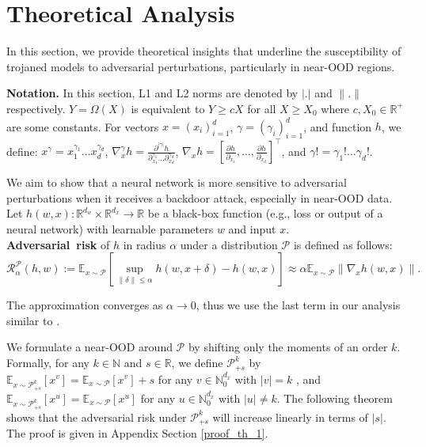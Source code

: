 \section{Theoretical Analysis }
\label{sec:theory}
{\small
In this section, we provide theoretical insights that underline the susceptibility of trojaned models to adversarial perturbations, particularly in near-OOD regions. 

\textbf{Notation.} In this section, L1 and L2 norms are denoted by $|.|$ and $\|.\|$ respectively. $Y = \Omega(X)$ is equivalent to $Y \geq cX$ for all $X \geq X_0$ where $c, X_0 \in \mathbb{R}^{+}$ are some constants. For vectors $x = (x_i)_{i=1}^{d}$, $\gamma = (\gamma_i)_{i=1}^{d}$, and function $h$, we define: $x^\gamma = x_1^{\gamma_1}\dots x_d^{\gamma_d}$, $\nabla_x^{\gamma} h = \frac{\partial^{|\gamma|}h}{\partial_{x_1}^{\gamma_1}\dots\partial_{x_d}^{\gamma_d}}$, $\nabla_x h = [\frac{\partial h}{\partial_{x_1}}, \dots, \frac{\partial h}{\partial_{x_d}}]^\top$, and $\gamma! = \gamma_1!\dots \gamma_d!$.

We aim to show that a neural network is more sensitive to adversarial perturbations when it receives a backdoor attack, especially in near-OOD data. Let $h(w,x): \mathbb{R}^{d_w} \times \mathbb{R}^{d_x} \to \mathbb{R}$ be a black-box function (e.g., loss or output of a neural network) with learnable parameters $w$ and input $x$.\\ \textbf{Adversarial\ risk} of $h$ in radius $\alpha$ under a distribution $\mathcal{P}$ is defined as follows:
\begin{equation*}
    \mathcal{R}^{\mathcal{P}}_{\alpha}(h,w) := \mathbb{E}_{x \sim \mathcal{P}} \left[  \sup_{\|\delta\| \leq \alpha} h(w,x+\delta) - h(w,x) \right] \approx \alpha \mathbb{E}_{x \sim \mathcal{P}} \| \nabla_x h(w,x) \|.
\end{equation*}

The approximation converges as $\alpha \rightarrow 0$, thus we use the last term in our analysis similar to \cite{simon2019first, hao2024surprising}.



We formulate a near-OOD around $\mathcal{P}$ by shifting only the moments of an order $k$. Formally, for any $k \in \mathbb{N}$ and $s \in \mathbb{R}$, we define $\mathcal{P}^{k}_{+s}$ by $\mathbb{E}_{x \sim \mathcal{P}^{k}_{+s}} \left[ x^v \right] = \mathbb{E}_{x \sim \mathcal{P}} \left[ x^v \right] + s$ for any $v \in \mathbb{N}_0^{d_x}$ with $|v|=k$ , and $\mathbb{E}_{x \sim \mathcal{P}^{k}_{+s}} \left[ x^u \right] = \mathbb{E}_{x \sim \mathcal{P}} \left[ x^u \right] $ for any $u \in \mathbb{N}_0^{d_x}$ with $|u| \neq k$. The following theorem shows that the adversarial risk under $\mathcal{P}^{k}_{+s}$ will increase linearly in terms of $|s|$. The proof is given in Appendix Section \ref{proof_th_1}.

}
